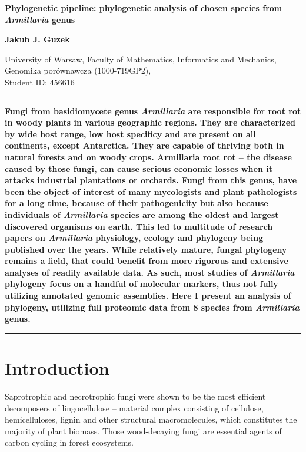 \documentclass[two column, twoside, a4paper]{article}
\begin{document}
\begin{strip}
	{\bfseries \LARGE {}\selectfont Phylogenetic pipeline: phylogenetic analysis of chosen species from \textit{Armillaria} genus} \vspace{\baselineskip}

	{\bfseries \large Jakub J. Guzek}

	{University of Warsaw, Faculty of Mathematics, Informatics and Mechanics, Genomika porównawcza (1000-719GP2), \\ Student ID: 456616}\vspace{\baselineskip}

	\hrule\vspace{\baselineskip}

	\textbf{\textsf{Fungi from basidiomycete genus \textit{Armillaria} are responsible for root rot in woody plants in various geographic regions. They are characterized by wide host range, low host specificy and are present on all continents, except Antarctica. They are capable of thriving both in natural forests and on woody crops. Armillaria root rot -- the disease caused by those fungi, can cause serious economic losses when it attacks industrial plantations or orchards. Fungi from this genus, have been the object of interest of many mycologists and plant pathologists for a long time, because of their pathogenicity but also because individuals of \textit{Armillaria} species are among the oldest and largest discovered organisms on earth. This led to multitude of research papers on \textit{Armillaria} physiology, ecology and phylogeny being published over the years. While relatively mature, fungal phylogeny remains a field, that could benefit from more rigorous and extensive analyses of readily available data. As such, most studies of \textit{Armillaria} phylogeny focus on a handful of molecular markers, thus not fully utilizing annotated genomic assemblies. Here I present an analysis of phylogeny, utilizing full proteomic data from 8 species from \textit{Armillaria} genus.}}
	\vspace{\baselineskip}

	\hrule

\end{strip}

\section{Introduction}

Saprotrophic and necrotrophic fungi were shown to be the most efficient decomposers of lingocellulose -- material complex consisting of cellulose, hemicelluloses, lignin and other structural macromolecules, which constitutes the majority of plant biomass\autocite{Harley1971}. Those wood-decaying fungi are essential agents of carbon cycling in forest ecosystems\autocite{Heimann2008}. 
\end{document}
